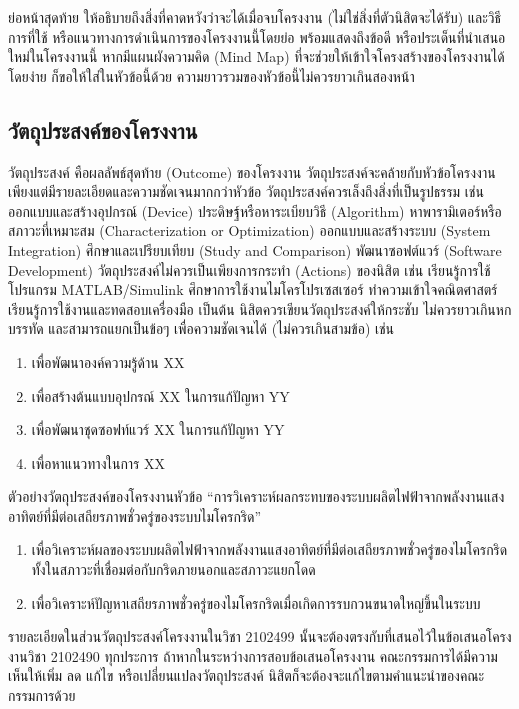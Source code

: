 \documentclass[11pt,a4paper]{article}
\begin{document}
ย่อหน้าสุดท้าย ให้อธิบายถึงสิ่งที่คาดหวังว่าจะได้เมื่อจบโครงงาน (ไม่ใช่สิ่งที่ตัวนิสิตจะได้รับ) และวิธีการที่ใช้ หรือแนวทางการดำเนินการของโครงงานนี้โดยย่อ พร้อมแสดงถึงข้อดี หรือประเด็นที่นำเสนอใหม่ในโครงงานนี้ หากมีแผนผังความคิด (Mind Map) ที่จะช่วยให้เข้าใจโครงสร้างของโครงงานได้โดยง่าย ก็ขอให้ใส่ในหัวข้อนี้ด้วย ความยาวรวมของหัวข้อนี้ไม่ควรยาวเกินสองหน้า

\subsection{วัตถุประสงค์ของโครงงาน}
วัตถุประสงค์ คือผลลัพธ์สุดท้าย (Outcome) ของโครงงาน วัตถุประสงค์จะคล้ายกับหัวข้อโครงงาน เพียงแต่มีรายละเอียดและความชัดเจนมากกว่าหัวข้อ วัตถุประสงค์ควรเล็งถึงสิ่งที่เป็นรูปธรรม เช่น ออกแบบและสร้างอุปกรณ์ (Device) ประดิษฐ์หรือหาระเบียบวิธี (Algorithm) หาพารามิเตอร์หรือสภาวะที่เหมาะสม (Characterization or Optimization) ออกแบบและสร้างระบบ (System Integration) ศึกษาและเปรียบเทียบ (Study and Comparison) พัฒนาซอฟต์แวร์ (Software Development) วัตถุประสงค์ไม่ควรเป็นเพียงการกระทำ (Actions) ของนิสิต เช่น เรียนรู้การใช้โปรแกรม MATLAB/Simulink ศึกษาการใช้งานไมโครโปรเซสเซอร์ ทำความเข้าใจคณิตศาสตร์ เรียนรู้การใช้งานและทดสอบเครื่องมือ เป็นต้น นิสิตควรเขียนวัตถุประสงค์ให้กระชับ ไม่ควรยาวเกินหกบรรทัด และสามารถแยกเป็นข้อๆ เพื่อความชัดเจนได้ (ไม่ควรเกินสามข้อ) เช่น
\begin{enumerate}
\item เพื่อพัฒนาองค์ความรู้ด้าน XX 
\item เพื่อสร้างต้นแบบอุปกรณ์ XX ในการแก้ปัญหา YY
\item เพื่อพัฒนาชุดซอฟท์แวร์ XX ในการแก้ปัญหา YY 
\item เพื่อหาแนวทางในการ XX
\end{enumerate}

ตัวอย่างวัตถุประสงค์ของโครงงานหัวข้อ “การวิเคราะห์ผลกระทบของระบบผลิตไฟฟ้าจากพลังงานแสงอาทิตย์ที่มีต่อเสถียรภาพชั่วครู่ของระบบไมโครกริด”
\begin{enumerate}
    \item เพื่อวิเคราะห์ผลของระบบผลิตไฟฟ้าจากพลังงานแสงอาทิตย์ที่มีต่อเสถียรภาพชั่วครู่ของไมโครกริด ทั้งในสภาวะที่เชื่อมต่อกับกริดภายนอกและสภาวะแยกโดด
    \item เพื่อวิเคราะห์ปัญหาเสถียรภาพชั่วครู่ของไมโครกริดเมื่อเกิดการรบกวนขนาดใหญ่ขึ้นในระบบ
\end{enumerate}

รายละเอียดในส่วนวัตถุประสงค์โครงงานในวิชา 2102499 นั้นจะต้องตรงกับที่เสนอไว้ในข้อเสนอโครงงานวิชา 2102490 ทุกประการ ถ้าหากในระหว่างการสอบข้อเสนอโครงงาน คณะกรรมการได้มีความเห็นให้เพิ่ม ลด แก้ไข หรือเปลี่ยนแปลงวัตถุประสงค์ นิสิตก็จะต้องจะแก้ไขตามคำแนะนำของคณะกรรมการด้วย
\end{document}
